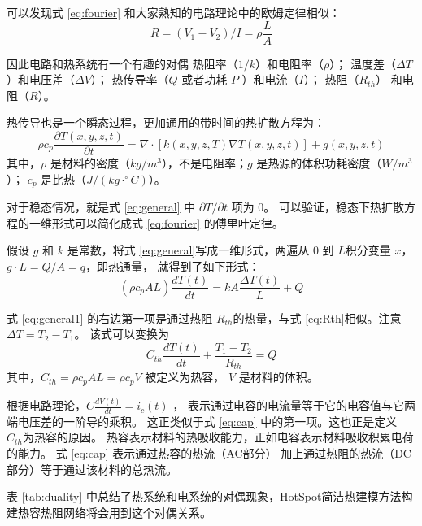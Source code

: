 可以发现式 \eqref{eq:fourier} 和大家熟知的电路理论中的欧姆定律相似：
\begin{equation}\label{eq:Ohm}
R = (V_1-V_2)/I = \rho \frac{L}{A}
\end{equation}

因此电路和热系统有一个有趣的对偶 \raisebox{0.5mm}{------}热阻率（$1/k$）和电阻率（$\rho$）；
温度差（$\Delta T$）和电压差（$\Delta V$）；
热传导率（$Q$ 或者功耗 $P$ ）和电流（$I$）；
热阻（$R_{th}$） 和电阻（$R$）。

热传导也是一个瞬态过程，更加通用的带时间的热扩散方程为：
\begin{equation}\label{eq:general}
 \rho c_p \frac{\partial T(x,y,z,t)}{\partial t} = \nabla \cdot[k(x,y,z,T)\nabla T(x,y,z,t)] +g(x,y,z,t)
\end{equation}
其中，$\rho$ 是材料的密度（$kg/m^3$），不是电阻率；$g$ 是热源的体积功耗密度（$W/m^3$）；
$c_p$ 是比热（$J/(kg \cdot ^\circ C)$）。

对于稳态情况，就是式 \eqref{eq:general} 中 $\partial T/\partial t $ 项为 0。
可以验证，稳态下热扩散方程的一维形式可以简化成式 \eqref{eq:fourier} 的傅里叶定律。

假设 $g$ 和 $k$ 是常数，将式 \eqref{eq:general}写成一维形式，两遍从 $0$ 到 $L$积分变量 $x$，$g\cdot L = Q/A = q$，即热通量， 就得到了如下形式：
\begin{equation}\label{eq:general1}
 (\rho c_p A L) \frac{d T(t)}{d t} = k A \frac{\Delta T(t)}{L} + Q
\end{equation}

式 \eqref{eq:general1} 的右边第一项是通过热阻 $R_{th}$的热量，与式 \eqref{eq:Rth}相似。注意$\Delta T = T_2 - T_1$。
该式可以变换为
\begin{equation}\label{eq:cap}
 C_{th} \frac{d T(t)}{d t} + \frac{ T_1 -T_2}{R_{th}} = Q
\end{equation}
其中，$C_{th} = \rho c_p A L = \rho c_p V $ 被定义为热容， $V$ 是材料的体积。

根据电路理论，$ C  \frac{d V(t)}{d t} = i_c(t)$ ， 表示通过电容的电流量等于它的电容值与它两端电压差的一阶导的乘积。
这正类似于式 \eqref{eq:cap} 中的第一项。这也正是定义 $C_{th}$为热容的原因。
热容表示材料的热吸收能力，正如电容表示材料吸收积累电荷的能力。
式 \eqref{eq:cap} 表示通过热容的热流（AC部分） 加上通过热阻的热流（DC部分）等于通过该材料的总热流。

表 \ref{tab:duality} 中总结了热系统和电系统的对偶现象，HotSpot简洁热建模方法构建热容热阻网络将会用到这个对偶关系。

